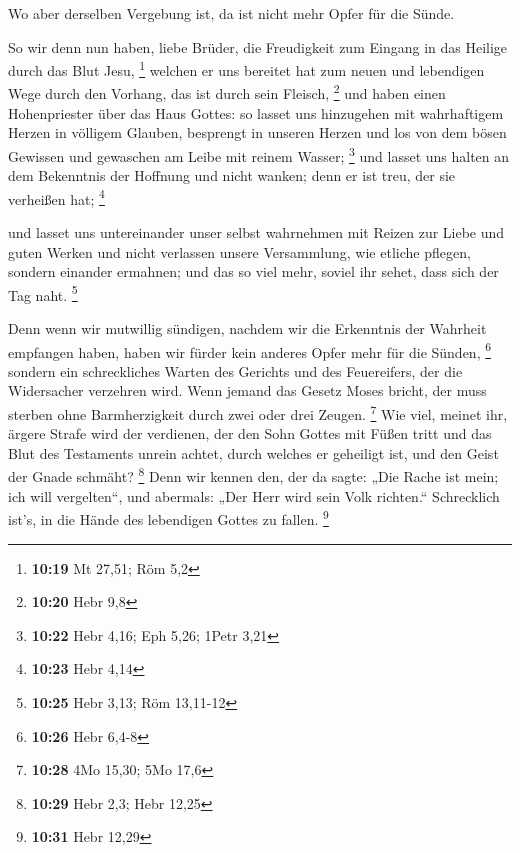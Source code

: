  Wo aber derselben Vergebung ist, da ist nicht mehr Opfer
für die Sünde.

 So wir denn nun haben, liebe Brüder, die Freudigkeit zum
Eingang in das Heilige durch das Blut Jesu, \footnote{\textbf{10:19} Mt
  27,51; Röm 5,2}  welchen er uns bereitet hat zum neuen
und lebendigen Wege durch den Vorhang, das ist durch sein Fleisch,
\footnote{\textbf{10:20} Hebr 9,8}  und haben einen
Hohenpriester über das Haus Gottes:  so lasset uns
hinzugehen mit wahrhaftigem Herzen in völligem Glauben, besprengt in
unseren Herzen und los von dem bösen Gewissen und gewaschen am Leibe mit
reinem Wasser; \footnote{\textbf{10:22} Hebr 4,16; Eph 5,26; 1Petr 3,21}
 und lasset uns halten an dem Bekenntnis der Hoffnung und
nicht wanken; denn er ist treu, der sie verheißen hat; \footnote{\textbf{10:23}
  Hebr 4,14}

 und lasset uns untereinander unser selbst wahrnehmen mit
Reizen zur Liebe und guten Werken  und nicht verlassen
unsere Versammlung, wie etliche pflegen, sondern einander ermahnen; und
das so viel mehr, soviel ihr sehet, dass sich der Tag naht. \footnote{\textbf{10:25}
  Hebr 3,13; Röm 13,11-12}

 Denn wenn wir mutwillig sündigen, nachdem wir die
Erkenntnis der Wahrheit empfangen haben, haben wir fürder kein anderes
Opfer mehr für die Sünden, \footnote{\textbf{10:26} Hebr 6,4-8}
 sondern ein schreckliches Warten des Gerichts und des
Feuereifers, der die Widersacher verzehren wird.  Wenn
jemand das Gesetz Moses bricht, der muss sterben ohne Barmherzigkeit
durch zwei oder drei Zeugen. \footnote{\textbf{10:28} 4Mo 15,30; 5Mo
  17,6}  Wie viel, meinet ihr, ärgere Strafe wird der
verdienen, der den Sohn Gottes mit Füßen tritt und das Blut des
Testaments unrein achtet, durch welches er geheiligt ist, und den Geist
der Gnade schmäht? \footnote{\textbf{10:29} Hebr 2,3; Hebr 12,25}
 Denn wir kennen den, der da sagte: „Die Rache ist mein;
ich will vergelten``, und abermals: „Der Herr wird sein Volk richten.``
 Schrecklich ist's, in die Hände des lebendigen Gottes zu
fallen. \footnote{\textbf{10:31} Hebr 12,29}

